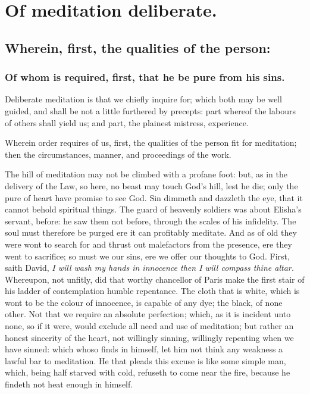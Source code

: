 \chapter{Of meditation deliberate.}

\section{Wherein, first, the qualities of the person:}
\subsection{Of whom is required, first, that he be pure from his sins.}

Deliberate meditation is that we chiefly inquire for; which both may be well guided, and shall be not a little furthered by precepts: part whereof the labours of others shall yield us; and part, the plainest mistress, experience. 

Wherein order requires of us, first, the qualities of the person fit for meditation; then the circumstances, manner, and proceedings of the work. 

The hill of meditation may not be climbed with a profane foot: but, as in the delivery of the Law, so here, no beast may touch God's hill, lest he die; only the pure of heart have promise to see God. Sin dimmeth and dazzleth the eye, that it cannot behold spiritual things. The guard of heavenly soldiers was about Elisha's servant, before: he saw them not before, through the scales of his infidelity. The soul must therefore be purged ere it can profitably meditate. And as of old they were wont to search for and thrust out malefactors from the presence, ere they went to sacrifice; so must we our sins, ere we offer our thoughts to God. First, saith David, \emph{I will wash my hands in innocence then I will compass thine altar.} Whereupon, not unfitly, did that worthy chancellor of Paris make the first stair of his ladder of contemplation humble repentance. The cloth that is white, which is wont to be the colour of innocence, is capable of any dye; the black, of none other. Not that we require an absolute perfection; which, as it is incident unto none, so if it were, would exclude all need and use of meditation; but rather an honest sincerity of the heart, not willingly sinning, willingly repenting when we have sinned: which whoso finds in himself, let him not think any weakness a lawful bar to meditation. He that pleads this excuse is like some simple man, which, being half starved with cold, refuseth to come near the fire, because he findeth not heat enough in himself. 

